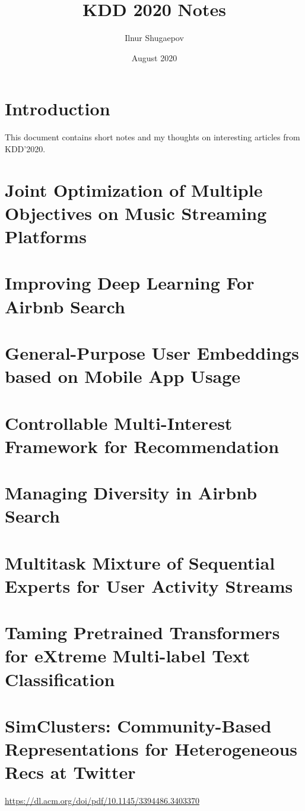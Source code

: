 \documentclass[11pt]{article}
\title{KDD 2020 Notes}
\author{Ilnur Shugaepov \\ \durl{VK.com}}
\date{August 2020}
\begin{document}
\maketitle
\tableofcontents
\newpage

\section*{Introduction}
This document contains short notes and my thoughts on interesting articles from KDD'2020.


\section{Joint Optimization of Multiple Objectives on Music Streaming Platforms~\cite{rishabh2020multiobjective}}

\section{Improving Deep Learning For Airbnb Search~\cite{haldar2020improving}}

\section{General-Purpose User Embeddings based on Mobile App Usage~\cite{zhang2020general}}

\section{Controllable Multi-Interest Framework for Recommendation}

\section{Managing Diversity in Airbnb Search~\cite{abdool2020managing}}

\section{Multitask Mixture of Sequential Experts for User Activity Streams}

\section{Taming Pretrained Transformers for eXtreme Multi-label Text Classification}

\section{SimClusters: Community-Based Representations for Heterogeneous Recs at Twitter}
\url{https://dl.acm.org/doi/pdf/10.1145/3394486.3403370}
\end{document}
